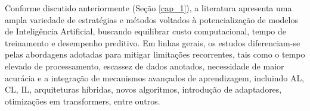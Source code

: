 Conforme discutido anteriormente (Seção \ref{cap_1}), a literatura apresenta uma ampla variedade de estratégias e métodos voltados à potencialização de modelos de Inteligência Artificial, buscando equilibrar custo computacional, tempo de treinamento e desempenho preditivo. Em linhas gerais, os estudos diferenciam-se pelas abordagens adotadas para mitigar limitações recorrentes, tais como o tempo elevado de processamento, escassez de dados anotados, necessidade de maior acurácia e a integração de mecanismos avançados de aprendizagem, incluindo \ac{AL}, \ac{CL}, \ac{IL}, arquiteturas híbridas, novos algoritmos, introdução de adaptadores, otimizações em transformers, entre outros.


